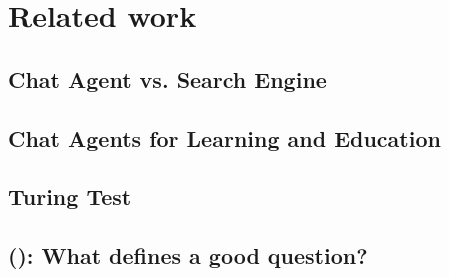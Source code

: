 \chapter{Related work}
\label{chapter3:related_work}


\section{Chat Agent vs. Search Engine}
\label{chapter3:chatbot_vs_search_engine}


\section{Chat Agents for Learning and Education}
\label{chapter3:learning_with_chatbots}


\section{Turing Test}
\label{chapter3:turing_test}


\section{ (): What defines a good question?}
\label{chapter3:define_good_question}


